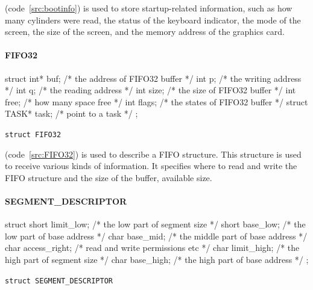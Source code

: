 \documentclass{swfcthesis}
\begin{document}
(code~\ref{src:bootinfo}) is used to store startup-related
information, such as how many cylinders were read, the status of the keyboard indicator,
the mode of the screen, the size of the screen, and the memory address of the graphics
card.


\paragraph{FIFO32}

\begin{listing}[H]
  \begin{codeblock}
\begin{ccode}
struct 
{ 
  int* buf;          /* the address of FIFO32 buffer */
  int p;             /* the writing address */
  int q;             /* the reading address */
  int size;          /* the size of FIFO32 buffer */
  int free;          /* how many space free */
  int flags;         /* the states of FIFO32 buffer */
  struct TASK* task; /* point to a task */ 
};
\end{ccode}
  \end{codeblock}
  \caption{\texttt{struct FIFO32}}\label{src:FIFO32}
\end{listing}

(code~\ref{src:FIFO32}) is used to
describe a FIFO structure. This structure is used to receive various kinds of
information. It specifies where to read and write the FIFO structure and the size of the
buffer, available size.


\paragraph{SEGMENT\_DESCRIPTOR}

\begin{listing}[H]
  \begin{codeblock}
\begin{ccode}
struct 
{ 
  short limit_low;   /* the low part of segment size */
  short base_low;    /* the low part of base address */
  char base_mid;     /* the middle part of base address */
  char access_right; /* read and write permissions etc */
  char  limit_high;  /* the high part of segment size */
  char base_high;    /* the high part of base address */
};
\end{ccode}
  \end{codeblock}
  \caption{\texttt{struct SEGMENT\_DESCRIPTOR}}\label{src:DESCRIPTOR}
\end{listing}
\end{document}
